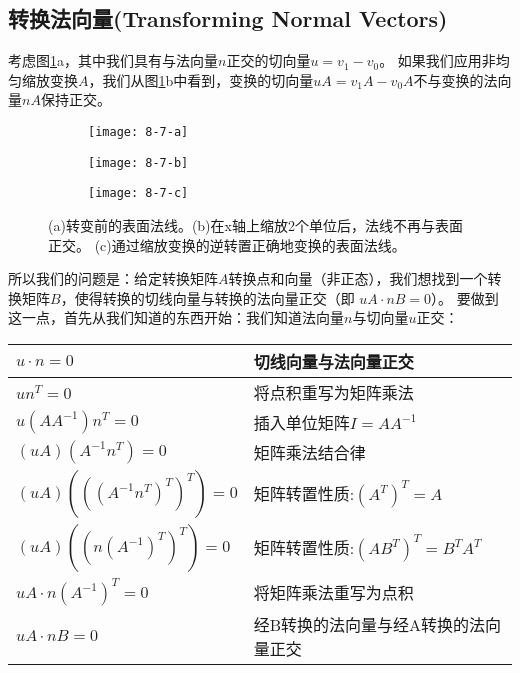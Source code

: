 \subsection{转换法向量(Transforming Normal Vectors)}
\begin{flushleft}
考虑图\ref{fig:8-7}a，其中我们具有与法向量$n$正交的切向量$u=v_{1}-v_{0}$。 如果我们应用非均匀缩放变换$A$，我们从图\ref{fig:8-7}b中看到，变换的切向量$uA=v_{1}A-v_{0}A$不与变换的法向量$nA$保持正交。
\end{flushleft}

\begin{figure}
\begin{subfigure}{1\textwidth}
  \centering
  \texttt{[image: 8-7-a]}
\end{subfigure}
\begin{subfigure}{1\textwidth}
  \centering
  \texttt{[image: 8-7-b]}
\end{subfigure}
\begin{subfigure}{1\textwidth}
  \centering
  \texttt{[image: 8-7-c]}
\end{subfigure}
\caption{(a)转变前的表面法线。(b)在x轴上缩放2个单位后，法线不再与表面正交。 (c)通过缩放变换的逆转置正确地变换的表面法线。}
\label{fig:8-7}
\end{figure}

\begin{flushleft}
所以我们的问题是：给定转换矩阵$A$转换点和向量（非正态），我们想找到一个转换矩阵$B$，使得转换的切线向量与转换的法向量正交（即 $uA\cdot nB = 0$）。 要做到这一点，首先从我们知道的东西开始：我们知道法向量$n$与切向量$u$正交：\\
\end{flushleft}

\begin{tabular}{|p{5em}|p{35em}|} 
\hline
$u\cdot n=0$ & 切线向量与法向量正交\\ 
\hline
$un^{T}=0$ & 将点积重写为矩阵乘法\\ 
\hline
$u(AA^{-1})n^{T}=0$ & 插入单位矩阵$I=AA^{-1}$\\
\hline 
$(uA)(A^{-1}n^{T})=0$ & 矩阵乘法结合律\\
\hline 
$(uA)(((A^{-1}n^{T})^{T})^{T})=0$ & 矩阵转置性质:$(A^{T})^{T}=A$\\
\hline 
$(uA)((n(A^{-1})^{T})^{T})=0$ & 矩阵转置性质:$(AB^{T})^{T}=B^{T}A^{T}$\\
\hline 
$uA\cdot n(A^{-1})^{T}=0$ & 将矩阵乘法重写为点积\\ 
\hline
$uA\cdot nB=0$ & 经B转换的法向量与经A转换的法向量正交\\ 
\hline
\end{tabular}

